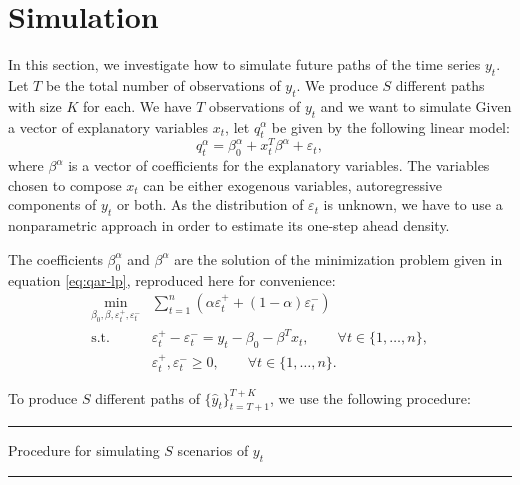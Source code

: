 \section{Simulation}
\label{sec:simulation}

In this section, we investigate how to simulate future paths of the time series $y_t$. 
Let $T$ be the total number of observations of $y_t$. We produce $S$ different paths with size $K$ for each. 
We have $T$ observations of $y_t$ and we want to simulate  Given a vector of explanatory variables $x_t$, let $q_t^\alpha$ be given by the following linear model:
\begin{equation}
q_t^\alpha = \beta_0^\alpha +  x_t^T \beta^\alpha + \varepsilon_t,
\label{eq:fun-quantile}
\end{equation}
where $\beta^\alpha$ is a vector of coefficients for the explanatory variables. The variables chosen to compose $x_t$ can be either exogenous variables, autoregressive components of $y_t$ or both. As the distribution of $\varepsilon_t$ is unknown, we have to use a nonparametric approach in order to estimate its one-step ahead density.

The coefficients $\beta_0^\alpha$ and $\beta^\alpha$ are the solution of the minimization problem given in equation \ref{eq:qar-lp}, reproduced here for convenience:
\begin{equation}
\begin{aligned}\min_{\beta_0,\beta,\varepsilon_{t}^{+},\varepsilon_{t}^{-}} & \sum_{t=1}^{n}\left(\alpha\varepsilon_{t}^{+}+(1-\alpha)\varepsilon_{t}^{-}\right)\\
\mbox{s.t. } & \varepsilon_{t}^{+}-\varepsilon_{t}^{-}=y_{t} - \beta_0 - \beta^T x_{t},\qquad\forall t\in\{1,\dots,n\},\\
& \varepsilon_t^+,\varepsilon_t^- \geq 0, \qquad \forall t \in \{1,\dots,n\}.
\end{aligned}
\label{eq:problem-quantile-regression}
\end{equation}

To produce $S$ different paths of $\{ \hat{y}_t \}_{t=T+1}^{T+K}$, we use the following procedure:

\noindent\rule{\textwidth}{3pt}

Procedure for simulating $S$ scenarios of $y_t$

\noindent\rule{\textwidth}{1pt}

